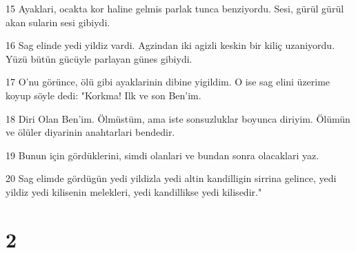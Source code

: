 \par 15 Ayaklari, ocakta kor haline gelmis parlak tunca benziyordu. Sesi, gürül gürül akan sularin sesi gibiydi.
\par 16 Sag elinde yedi yildiz vardi. Agzindan iki agizli keskin bir kiliç uzaniyordu. Yüzü bütün gücüyle parlayan günes gibiydi.
\par 17 O'nu görünce, ölü gibi ayaklarinin dibine yigildim. O ise sag elini üzerime koyup söyle dedi: "Korkma! Ilk ve son Ben'im.
\par 18 Diri Olan Ben'im. Ölmüstüm, ama iste sonsuzluklar boyunca diriyim. Ölümün ve ölüler diyarinin anahtarlari bendedir.
\par 19 Bunun için gördüklerini, simdi olanlari ve bundan sonra olacaklari yaz.
\par 20 Sag elimde gördügün yedi yildizla yedi altin kandilligin sirrina gelince, yedi yildiz yedi kilisenin melekleri, yedi kandillikse yedi kilisedir."

\chapter{2}

